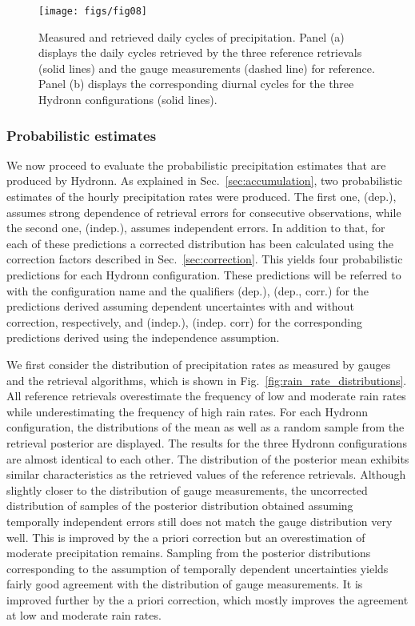 \documentclass[journal abbreviation, manuscript]{copernicus}
\begin{document}
\begin{figure}[hbpt]
  \centering
  \texttt{[image: figs/fig08]}
  \caption{
    Measured and retrieved daily cycles of precipitation. Panel (a) displays the
    daily cycles retrieved by the three reference retrievals (solid lines) and
    the gauge measurements (dashed line) for reference. Panel (b) displays the
    corresponding diurnal cycles for the three Hydronn configurations (solid
    lines).
  }
  \label{fig:daily_cycle}
\end{figure}

\subsubsection{Probabilistic estimates}

We now proceed to evaluate the probabilistic precipitation estimates that are
produced by Hydronn. As explained in Sec.~\ref{sec:accumulation}, two
probabilistic estimates of the hourly precipitation rates were produced. The
first one, (dep.), assumes strong dependence of retrieval errors for consecutive
observations, while the second one, (indep.), assumes independent errors. In
addition to that, for each of these predictions a corrected distribution has
been calculated using the correction factors described in
Sec.~\ref{sec:correction}. This yields four probabilistic predictions for each
Hydronn configuration. These predictions will be referred to with the
configuration name and the qualifiers (dep.), (dep., corr.) for the predictions
derived assuming dependent uncertaintes with and without correction,
respectively, and (indep.), (indep. corr) for the corresponding predictions
derived using the independence assumption.

We first consider the distribution of precipitation rates as measured by gauges
and the retrieval algorithms, which is shown in
Fig.~\ref{fig:rain_rate_distributions}. All reference retrievals overestimate
the frequency of low and moderate rain rates while underestimating the frequency
of high rain rates. For each Hydronn configuration, the distributions of the
mean as well as a random sample from the retrieval posterior are displayed. The
results for the three Hydronn configurations are almost identical to each other.
The distribution of the posterior mean exhibits similar characteristics as the
retrieved values of the reference retrievals. Although slightly closer to the
distribution of gauge measurements, the uncorrected distribution of samples of
the posterior distribution obtained assuming temporally independent errors still
does not match the gauge distribution very well. This is improved by the a
priori correction but an overestimation of moderate precipitation remains.
Sampling from the posterior distributions corresponding to the assumption of
temporally dependent uncertainties yields fairly good agreement with the
distribution of gauge measurements. It is improved further by the a priori
correction, which mostly improves the agreement at low and moderate rain rates.
\end{document}
